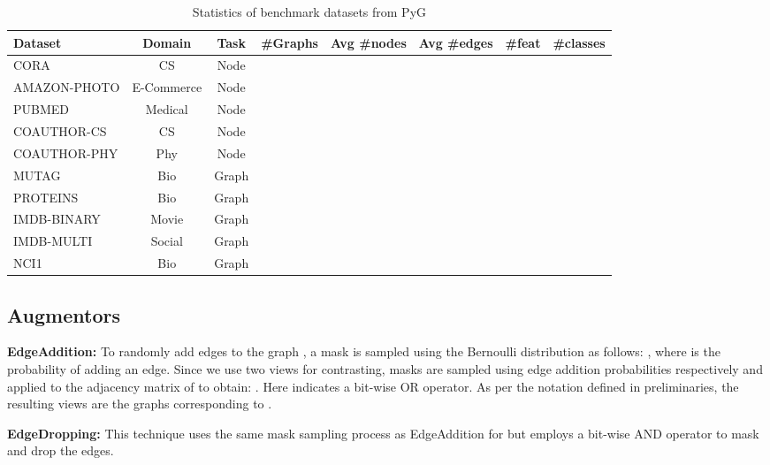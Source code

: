\documentclass{article}
\theoremstyle{plain}
\theoremstyle{definition}
\theoremstyle{remark}
\begin{document}
\begin{table*}[ht!]
\centering
\caption{Statistics of benchmark datasets from PyG}
\label{table:datasets}
\vskip 0.15in
\begin{center}
\begin{small}
\begin{sc}
\begin{tabular}{lccccccr}
\toprule
Dataset & Domain & Task &  \#Graphs & Avg \#nodes & Avg \#edges & \#feat & \#classes \\
\midrule
CORA & CS & Node &  &  &  &  & \\
AMAZON-PHOTO & E-Commerce & Node &  &  &  &  &  \\
PUBMED &  Medical & Node &  &  &  &  &  \\
COAUTHOR-CS & CS & Node &  &  &  &  &  \\
COAUTHOR-PHY & Phy & Node &  &  &  &  &  \\
\midrule
MUTAG & Bio & Graph &  &  &  &  &  \\
PROTEINS & Bio & Graph &  &  &  &  &  \\
IMDB-BINARY & Movie & Graph &  &  &  &  &  \\
IMDB-MULTI & Social & Graph &  &  &  &  &  \\
NCI1 & Bio & Graph &  &  &  &  &  \\
\bottomrule
\end{tabular}
\end{sc}
\end{small}
\end{center}
\vskip -0.1in
\end{table*}

\subsection{Augmentors}

\textbf{EdgeAddition:} To randomly add edges to the graph , a mask  is sampled using the Bernoulli distribution as follows: , where  is the probability of adding an edge. Since we use two views for contrasting, masks  are sampled using edge addition probabilities  respectively and applied to the adjacency matrix  of  to obtain: . Here  indicates a bit-wise OR operator.  As per the notation defined in preliminaries, the resulting views  are the graphs corresponding to .

\textbf{EdgeDropping:} This technique uses the same mask sampling process as EdgeAddition for  but employs a bit-wise AND operator to mask and drop the edges. 
\end{document}
